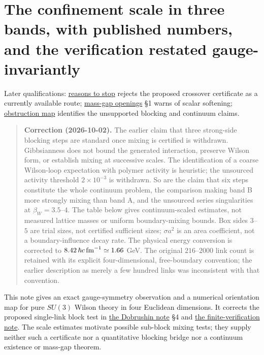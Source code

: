 \documentclass[11pt,a4paper]{article}
\begin{document}
\hypertarget{the-confinement-scale-in-three-bands-with-published-numbers-and-the-verification-restated-gauge-invariantly}{%
\section{The confinement scale in three bands, with published numbers,
and the verification restated
gauge-invariantly}\label{the-confinement-scale-in-three-bands-with-published-numbers-and-the-verification-restated-gauge-invariantly}}

Later qualifications:
\href{mass-gap-openings.md\#correlation-inequalities-and-the-transfer-they-require}{reasons
to stop} rejects the proposed crossover certificate as a currently
available route; \href{mass-gap-openings.md}{mass-gap openings} §1 warns
of scalar softening; \href{../research/obstructions.md}{obstruction map}
identifies the unsupported blocking and continuum claims.

\begin{quote}
\textbf{Correction (2026-10-02).} The earlier claim that three
strong-side blocking steps are standard once mixing is certified is
withdrawn. Gibbsianness does not bound the generated interaction,
preserve Wilson form, or establish mixing at successive scales. The
identification of a coarse Wilson-loop expectation with polymer activity
is heuristic; the unsourced activity threshold \(2\times10^{-3}\) is
withdrawn. So are the claim that six steps constitute the whole
continuum problem, the comparison making band B more strongly mixing
than band A, and the unsourced series singularities at
\(\beta_W=3.5\)--\(4\). The table below gives continuum-scaled
estimates, not measured lattice masses or uniform boundary-mixing
bounds. Box sides \(3\)--\(5\) are trial sizes, not certified sufficient
sizes; \(\sigma a^2\) is an area coefficient, not a boundary-influence
decay rate. The physical energy conversion is corrected to
\(8.42\,\hbar c\,{\rm fm}^{-1}\simeq1.66\) GeV. The original
\(216\)--\(2000\) link count is retained with its explicit
four-dimensional, free-boundary convention; the earlier description as
merely a few hundred links was inconsistent with that convention.
\end{quote}

This note gives an exact gauge-symmetry observation and a numerical
orientation map for pure \(SU(3)\) Wilson theory in four Euclidean
dimensions. It corrects the proposed single-link block test in
\href{dobrushin-uniqueness-wilson.md}{the Dobrushin note} §4 and
\href{intermediate-region-finite-verification.md}{the
finite-verification note}. The scale estimates motivate possible
sub-block mixing tests; they supply neither such a certificate nor a
quantitative blocking bridge nor a continuum existence or mass-gap
theorem.
\end{document}

